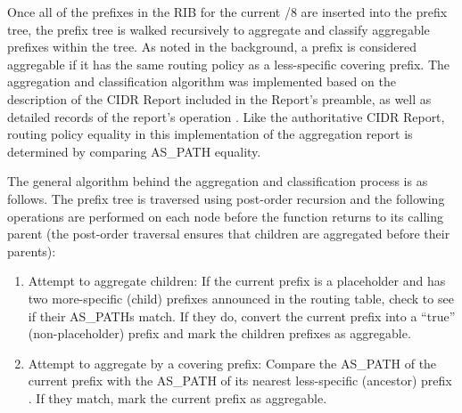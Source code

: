 
Once all of the prefixes in the RIB for the current /8 are inserted into the prefix tree, the prefix tree is walked recursively to aggregate and classify aggregable prefixes within the tree. As noted in the background, a prefix is considered aggregable if it has the same routing policy as a less-specific covering prefix. The aggregation and classification algorithm was implemented based on the description of the CIDR Report included in the Report's preamble, as well as detailed records of the report's operation \cite{cidr-report-details}. Like the authoritative CIDR Report, routing policy equality in this implementation of the aggregation report is determined by comparing AS\_PATH equality.

The general algorithm behind the aggregation and classification process is as follows. The prefix tree is traversed using post-order recursion and the following operations are performed on each node before the function returns to its calling parent (the post-order traversal ensures that children are aggregated before their parents):
\begin{enumerate}
\item{Attempt to aggregate children: If the current prefix is a placeholder and has two more-specific (child) prefixes announced in the routing table, check to see if their AS\_PATHs match. If they do, convert the current prefix into a ``true'' (non-placeholder) prefix and mark the children prefixes as aggregable.}
\item{Attempt to aggregate by a covering prefix: Compare the AS\_PATH of the current prefix with the AS\_PATH of its nearest less-specific (ancestor) prefix . If they match, mark the current prefix as aggregable.}
\end{enumerate}

%

